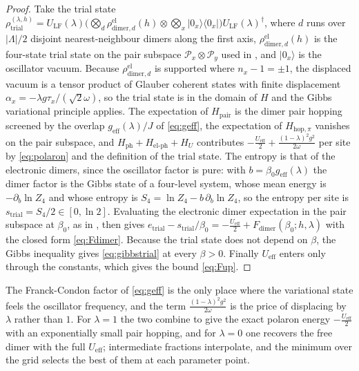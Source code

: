 \documentclass[11pt]{article}
\numberwithin{equation}{section}
\newcommand{\Lamb}{\Lambda}
\newcommand{\ph}{\mathrm{ph}}
\newcommand{\eff}{\mathrm{eff}}
\newcommand{\hop}{\mathrm{hop}}
\newcommand{\pair}{\mathrm{pair}}
\theoremstyle{definition}
\begin{document}
\begin{proof}
Take the trial state
$\rho^{(\lambda,h)}_{\mathrm{trial}}=U_{\mathrm{LF}}(\lambda)\big(\bigotimes_{d}\rho^{\mathrm{el}}_{\mathrm{dimer},d}(h)\otimes\bigotimes_{x}|0_{x}\rangle\langle 0_{x}|\big)U_{\mathrm{LF}}(\lambda)^{\dagger}$,
where $d$ runs over $|\Lamb|/2$ disjoint nearest-neighbour dimers along the first axis,
$\rho^{\mathrm{el}}_{\mathrm{dimer},d}(h)$ is the four-state trial state on the pair
subspace $\mathcal{P}_{x}\otimes\mathcal{P}_{y}$ used in \cite{rens2026pkodlro}, and
$|0_{x}\rangle$ is the oscillator vacuum. Because $\rho^{\mathrm{el}}_{\mathrm{dimer},d}$ is
supported where $n_{x}-1=\pm1$, the displaced vacuum is a tensor product of Glauber
coherent states with finite displacement $\alpha_{x}=-\lambda g\tau_{x}/(\sqrt2\omega)$,
so the trial state is in the domain of $H$ and the Gibbs variational principle applies.
The expectation of $H_{\pair}$ is the dimer pair hopping screened by the overlap
$g_{\eff}(\lambda)/J$ of \eqref{eq:geff}, the expectation of $H_{\hop,\pi}$ vanishes on the pair
subspace, and $H_{\ph}+H_{\text{el-ph}}+H_{U}$ contributes
$-\frac{U_{\eff}}{2}+\frac{(1-\lambda)^{2}g^{2}}{2\omega}$ per site by \eqref{eq:polaron} and the
definition of the trial state. The entropy is that of the electronic dimers, since the
oscillator factor is pure: with $b=\beta_0g_{\eff}(\lambda)$ the dimer factor is the Gibbs
state of a four-level system, whose mean energy is $-\partial_{b}\ln Z_{4}$ and whose
entropy is $S_{4}=\ln Z_{4}-b\,\partial_{b}\ln Z_{4}$, so the entropy per site is
$s_{\mathrm{trial}}=S_{4}/2\in[0,\ln2]$. Evaluating the electronic dimer expectation in
the pair subspace at $\beta_0$, as in \cite{rens2026pkodlro}, then gives
$e_{\mathrm{trial}}-s_{\mathrm{trial}}/\beta_0=-\frac{U_{\eff}}{2}+F_{\mathrm{dimer}}(\beta_0;h,\lambda)$
with the closed form \eqref{eq:Fdimer}. Because the trial state does not depend on $\beta$, the
Gibbs inequality gives \eqref{eq:gibbstrial} at every $\beta>0$. Finally
$U_{\eff}$ enters only through the constants, which gives the bound \eqref{eq:Fup}.
\end{proof}

The Franck-Condon factor of \eqref{eq:geff} is the only place where the variational state feels the
oscillator frequency, and the term $\frac{(1-\lambda)^{2}g^{2}}{2\omega}$ is the price of
displacing by $\lambda$ rather than $1$. For $\lambda=1$ the two combine to give the exact
polaron energy $-\frac{U_{\eff}}{2}$ with an exponentially small pair hopping, and for
$\lambda=0$ one recovers the free dimer with the full $U_{\eff}$; intermediate fractions
interpolate, and the minimum over the grid selects the best of them at each parameter
point.
\end{document}
